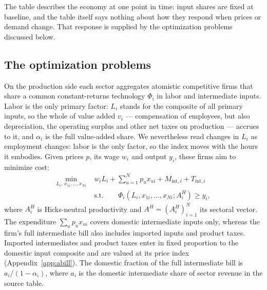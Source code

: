 The table describes the economy at one point in time: input shares are fixed at baseline, and the table itself says nothing about how they respond when prices or demand change. That response is supplied by the optimization problems discussed below.

\subsection{The optimization problems}\label{subsec:optimization}

On the production side each sector aggregates atomistic competitive firms that share a common constant-returns technology $\Phi_i$ in labor and intermediate inputs. Labor is the only primary factor: $L_i$ stands for the composite of all primary inputs, so the whole of value added $v_i$ --- compensation of employees, but also depreciation, the operating surplus and other net taxes on production --- accrues to it, and $\alpha_i$ is the full value-added share. We nevertheless read changes in $L_i$ as employment changes: labor is the only factor, so the index moves with the hours it embodies. Given prices $p$, its wage $w_i$ and output $y_i$, these firms aim to minimize cost:
\begin{equation}
\begin{aligned}
\min_{L_i,\,x_{1i},\ldots,x_{Ni}} \;& w_i L_i + \sum_{u=1}^N p_u x_{ui} + M_{\mathrm{int},i} + T_{\mathrm{int},i}
\\
&\text{s.t.} \qquad \Phi_i(L_i, x_{1i},\ldots,x_{Ni}; A_i^{H}) \geq y_i,
\end{aligned}
\label{eq:cost-min}
\end{equation}
where $A_i^{H}$ is Hicks-neutral productivity and $A^{H}=(A_i^{H})_{i=1}^N$ its sectoral vector. The expenditure $\sum_u p_u x_{ui}$ covers domestic intermediate inputs only, whereas the firm's full intermediate bill also includes imported inputs and product taxes. Imported intermediates and product taxes enter in fixed proportion to the domestic input composite and are valued at its price index (Appendix~\ref{app:abill}). The domestic fraction of the full intermediate bill is $a_i/(1-\alpha_i)$, where $a_i$ is the domestic intermediate share of sector revenue in the source table.

